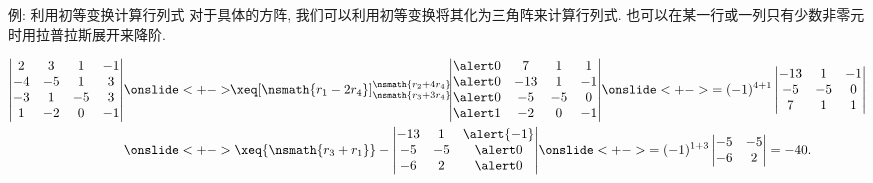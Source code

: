 \begin{frame}{例: 利用初等变换计算行列式}
	\onslide<+->
	对于具体的方阵, 我们可以利用初等变换将其化为三角阵来计算行列式.
	\onslide<+->
	也可以在某一行或一列只有少数非零元时用拉普拉斯展开来降阶.
	\onslide<+->
	\begin{example}
		\begin{align*}
			\begin{vmatrix}
				2& 3& 1&-1\\
				-4&-5& 1& 3\\
				-3& 1&-5& 3\\
				1&-2& 0&-1
			\end{vmatrix}
			&\onslide<+->{\!\!\xeq[\nsmath{r_1-2r_4}]{\substack{\nsmath{r_2+4r_4}\\\nsmath{r_3+3r_4}}}\!\!
			\begin{vmatrix}
				\alert0& 7& 1&1\\
				\alert0&-13& 1&-1\\
				\alert0&-5&-5&0\\
				\alert1&-2& 0&-1
			\end{vmatrix}}
			\onslide<+->{=(-1)^{4+1}\begin{vmatrix}
				-13& 1&-1\\
				-5&-5&0\\
					7& 1&1
				\end{vmatrix}}\\
			&\onslide<+->{\xeq{\nsmath{r_3+r_1}}
			-\begin{vmatrix}
				-13& 1&\alert{-1}\\
				-5&-5&\alert0\\
				-6& 2&\alert0
			\end{vmatrix}}
			\onslide<+->{=(-1)^{1+3}\begin{vmatrix}
				-5&-5\\-6&2
			\end{vmatrix}=-40.}
		\end{align*}
	\end{example}
\end{frame}

